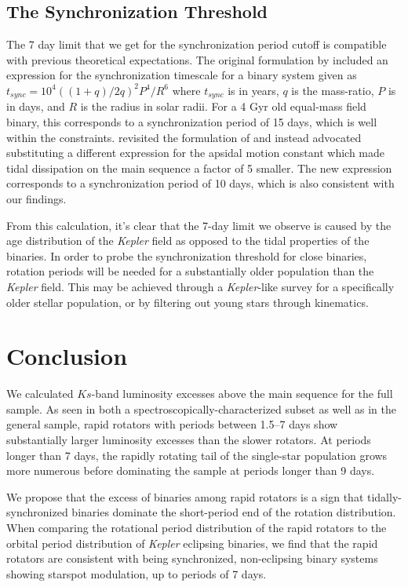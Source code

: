 \documentclass[twocolumn]{aastex6}
\newcommand{\Kepler}{\mbox{\textit{Kepler}}}
\begin{document}
\subsection{The Synchronization Threshold}

The 7 day limit that we get for the synchronization period cutoff is compatible
with previous theoretical expectations. The original formulation by
\citet{Zahn77} included an expression for the synchronization timescale for a
binary system given as \(t_{sync} = 10^4 ((1+q)/2q)^2 P^4 / R^6\) where \(t_{sync}\) is
in years, \(q\) is the mass-ratio, \(P\) is in days, and \(R\) is the radius in
solar radii. For a 4 Gyr old equal-mass field binary, this
corresponds to a synchronization period of 15 days, which is well within the
constraints. \citet{Claret97} revisited the formulation of \citet{Zahn77} and
instead advocated substituting a different expression for the apsidal motion 
constant which made tidal dissipation on the main sequence a factor of 5
smaller. The new expression corresponds to a synchronization period of 10 days,
which is also consistent with our findings.

From this calculation, it's clear that the 7-day limit we observe is caused by
the age distribution of the \Kepler{} field as opposed to the tidal properties
of the binaries. In order to probe the synchronization threshold for
close binaries, rotation periods will be needed for a substantially older
population than the \Kepler{} field. This may be achieved through a \Kepler-like
survey for a specifically older stellar population, or by filtering out young
stars through kinematics.

\section{Conclusion}
\label{sec:conclusions}

We calculated \(Ks\)-band luminosity excesses above the main sequence for the full
\citet{McQuillan14} sample. As seen in both a spectroscopically-characterized
subset as well as in the general sample, rapid rotators with periods between
1.5--7 days show substantially larger luminosity excesses than the slower
rotators. At periods longer than 7 days, the rapidly rotating tail of the
single-star population grows more numerous before dominating the sample at
periods longer than 9 days. 

We propose that the excess of binaries among rapid rotators is a sign that
tidally-synchronized binaries dominate the short-period end of the rotation
distribution. When comparing the rotational period distribution of the rapid 
rotators to the orbital period distribution of \Kepler{} eclipsing binaries, we
find that the rapid rotators are consistent with being synchronized, 
non-eclipsing binary systems showing starspot modulation, up to periods of 7
days.
\end{document}
